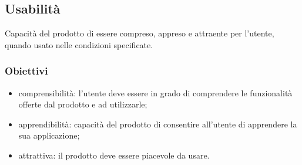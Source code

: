 	\subsection{Usabilità}
	Capacità del prodotto di essere compreso, appreso e attraente per l'utente, quando usato nelle condizioni specificate.
		\subsubsection{Obiettivi}
		\begin{itemize}
			\item comprensibilità: l'utente deve essere in grado di comprendere le funzionalità offerte dal prodotto e ad utilizzarle;
			\item apprendibilità: capacità del prodotto di consentire all'utente di apprendere la sua applicazione;
			\item attrattiva: il prodotto deve essere piacevole da usare.
		\end{itemize}
